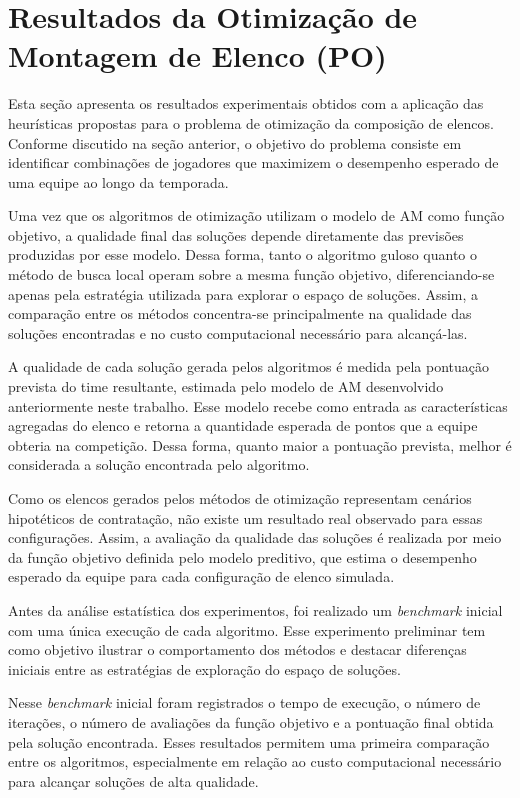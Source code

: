 \chapter{Resultados da Otimização de Montagem de Elenco (PO)}

Esta seção apresenta os resultados experimentais obtidos com a aplicação das heurísticas propostas para o problema de otimização da composição de elencos. 
Conforme discutido na seção anterior, o objetivo do problema consiste em identificar combinações de jogadores que maximizem o desempenho esperado de uma equipe 
ao longo da temporada.

Uma vez que os algoritmos de otimização utilizam o modelo de AM como função objetivo, a qualidade final das soluções depende diretamente 
das previsões produzidas por esse modelo. Dessa forma, tanto o algoritmo guloso quanto o método de busca local operam sobre a mesma função objetivo, 
diferenciando-se apenas pela estratégia utilizada para explorar o espaço de soluções. Assim, a comparação entre os métodos concentra-se principalmente 
na qualidade das soluções encontradas e no custo computacional necessário para alcançá-las.

A qualidade de cada solução gerada pelos algoritmos é medida pela pontuação prevista do time resultante, estimada pelo modelo de AM desenvolvido anteriormente neste trabalho. 
Esse modelo recebe como entrada as características agregadas do elenco e retorna a quantidade esperada de pontos que a equipe obteria na competição. 
Dessa forma, quanto maior a pontuação prevista, melhor é considerada a solução encontrada pelo algoritmo.

Como os elencos gerados pelos métodos de otimização representam cenários hipotéticos de contratação, não existe um resultado real observado para essas configurações. 
Assim, a avaliação da qualidade das soluções é realizada por meio da função objetivo definida pelo modelo preditivo, que estima o desempenho esperado da equipe 
para cada configuração de elenco simulada.

Antes da análise estatística dos experimentos, foi realizado um \textit{benchmark} inicial com uma única execução de cada algoritmo. Esse experimento preliminar tem como 
objetivo ilustrar o comportamento dos métodos e destacar diferenças iniciais entre as estratégias de exploração do espaço de soluções.

Nesse \textit{benchmark} inicial foram registrados o tempo de execução, o número de iterações, o número de avaliações da função objetivo e a pontuação final obtida 
pela solução encontrada. Esses resultados permitem uma primeira comparação entre os algoritmos, especialmente em relação ao custo computacional 
necessário para alcançar soluções de alta qualidade.

